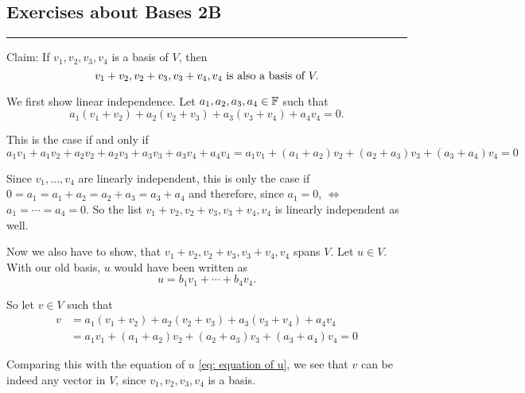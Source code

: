 \subsection*{Exercises about Bases 2B}
\hrule
\phantom{.}

\setcounter{xrcs}{5}
\begin{xrcs}
  Claim: If $v_1, v_2, v_3, v_4$ is a basis of $V$, then
  \begin{equation}
    v_1 + v_2, v_2 + v_3, v_3+v_4, v_4 $ is also a basis of $V.
  \end{equation}


  \begin{prf}
     We first show linear independence. Let $a_1, a_2, a_3, a_4 \in \mathbb{F}$ such that
    \begin{equation}
      a_1 (v_1+v_2) + a_2(v_2+v_3) + a_3(v_3+v_4)+a_4 v_4 = 0.
    \end{equation}

    This is the case if and only if
    \[
    a_1 v_1 + a_1 v_2 + a_2 v_2 + a_2 v_3 + a_3 v_3 + a_3 v_4 + a_4 v_4
    = a_1 v_1 + (a_1 + a_2) v_2 + (a_2 + a_3) v_3 + (a_3 + a_4)v_4=0
    \]

    Since $v_1, \ldots, v_4$ are linearly independent, this is only the case if $0 = a_1 = a_1 + a_2 = a_2 + a_3 = a_3 + a_4$ and therefore, since $a_1=0$, $\iff$ $a_1 = \cdots = a_4 = 0$. So the list $v_1 + v_2, v_2 + v_3, v_3+v_4, v_4$ is linearly independent as well.

     Now we also have to show, that $v_1 + v_2, v_2 + v_3, v_3+v_4, v_4$ spans $V$. Let $u \in V$. With our old basis, $u$ would have been written as
    \begin{equation}
      \label{eq: equation of u}
      u = b_1 v_1 + \cdots + b_4 v_4.
    \end{equation}

    So let $v \in V$ such that
    \[
      \begin{aligned}
        v
        & = a_1 (v_1+v_2) + a_2(v_2+v_3) + a_3(v_3+v_4)+a_4 v_4 \\
        & = a_1 v_1 + (a_1 + a_2) v_2 + (a_2 + a_3) v_3 + (a_3 + a_4)v_4=0
      \end{aligned}
    \]

    Comparing this with the equation of $u$ \eqref{eq: equation of u}, we see that $v$ can be indeed any vector in $V$, since $v_1, v_2, v_3, v_4$ is a basis.


\end{prf}
\end{xrcs}
